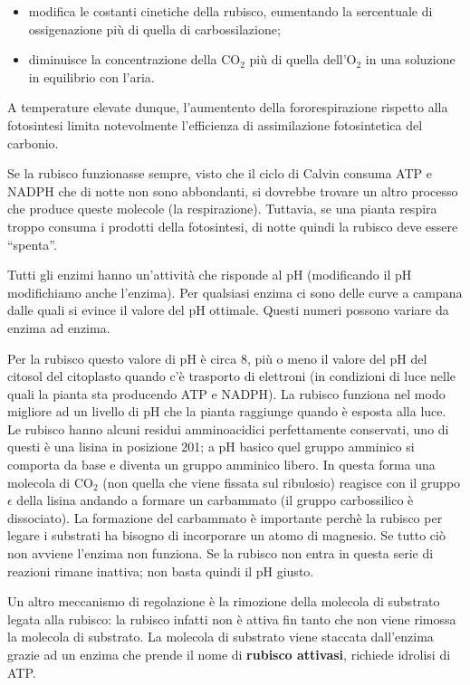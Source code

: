 \documentclass[]{article}
\begin{document}
\begin{itemize}
\itemsep1pt\parskip0pt
\item
  modifica le costanti cinetiche della rubisco, eumentando la
  sercentuale di ossigenazione più di quella di carbossilazione;
\item
  diminuisce la concentrazione della CO$_2$ più di quella dell'O$_2$ in
  una soluzione in equilibrio con l'aria.
\end{itemize}

A temperature elevate dunque, l'aumentento della fororespirazione
rispetto alla fotosintesi limita notevolmente l'efficienza di
assimilazione fotosintetica del carbonio.

Se la rubisco funzionasse sempre, visto che il ciclo di Calvin consuma
ATP e NADPH che di notte non sono abbondanti, si dovrebbe trovare un
altro processo che produce queste molecole (la respirazione). Tuttavia,
se una pianta respira troppo consuma i prodotti della fotosintesi, di
notte quindi la rubisco deve essere ``spenta''.

Tutti gli enzimi hanno un'attività che risponde al pH (modificando il pH
modifichiamo anche l'enzima). Per qualsiasi enzima ci sono delle curve a
campana dalle quali si evince il valore del pH ottimale. Questi numeri
possono variare da enzima ad enzima.

Per la rubisco questo valore di pH è circa 8, più o meno il valore del
pH del citosol del citoplasto quando c'è trasporto di elettroni (in
condizioni di luce nelle quali la pianta sta producendo ATP e NADPH). La
rubisco funziona nel modo migliore ad un livello di pH che la pianta
raggiunge quando è esposta alla luce. Le rubisco hanno alcuni residui
amminoacidici perfettamente conservati, uno di questi è una lisina in
posizione 201; a pH basico quel gruppo amminico si comporta da base e
diventa un gruppo amminico libero. In questa forma una molecola di
CO$_2$ (non quella che viene fissata sul ribulosio) reagisce con il
gruppo $\epsilon$ della lisina andando a formare un carbammato (il
gruppo carbossilico è dissociato). La formazione del carbammato è
importante perchè la rubisco per legare i substrati ha bisogno di
incorporare un atomo di magnesio. Se tutto ciò non avviene l'enzima non
funziona. Se la rubisco non entra in questa serie di reazioni rimane
inattiva; non basta quindi il pH giusto.

Un altro meccanismo di regolazione è la rimozione della molecola di
substrato legata alla rubisco: la rubisco infatti non è attiva fin tanto
che non viene rimossa la molecola di substrato. La molecola di substrato
viene staccata dall'enzima grazie ad un enzima che prende il nome di
\textbf{rubisco attivasi}, richiede idrolisi di ATP.
\end{document}
